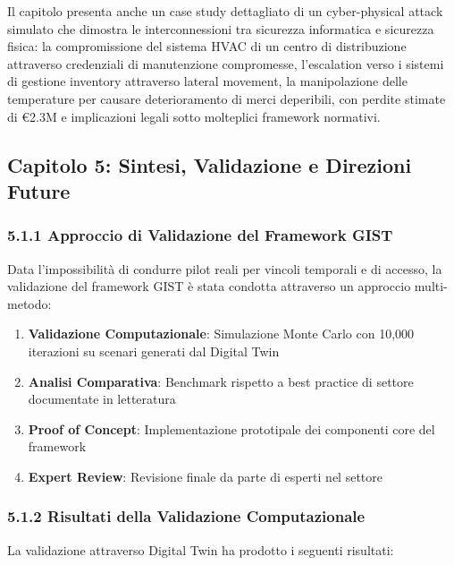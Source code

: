 Il capitolo presenta anche un case study dettagliato di un cyber-physical attack simulato che dimostra le interconnessioni tra sicurezza informatica e sicurezza fisica: la compromissione del sistema HVAC di un centro di distribuzione attraverso credenziali di manutenzione compromesse, l'escalation verso i sistemi di gestione inventory attraverso lateral movement, la manipolazione delle temperature per causare deterioramento di merci deperibili, con perdite stimate di €2.3M e implicazioni legali sotto molteplici framework normativi.

\subsection{Capitolo 5: Sintesi, Validazione e Direzioni Future}


\subsubsection{5.1.1 Approccio di Validazione del Framework GIST}

Data l'impossibilità di condurre pilot reali per vincoli temporali 
e di accesso, la validazione del framework GIST è stata condotta 
attraverso un approccio multi-metodo:

\begin{enumerate}
\item \textbf{Validazione Computazionale}: Simulazione Monte Carlo 
      con 10,000 iterazioni su scenari generati dal Digital Twin
      
\item \textbf{Analisi Comparativa}: Benchmark rispetto a best practice 
      di settore documentate in letteratura
      
\item \textbf{Proof of Concept}: Implementazione prototipale dei 
      componenti core del framework

\item \textbf{Expert Review}: Revisione finale da parte di esperti nel settore
\end{enumerate}

\subsubsection{5.1.2 Risultati della Validazione Computazionale}

La validazione attraverso Digital Twin ha prodotto i seguenti risultati:

